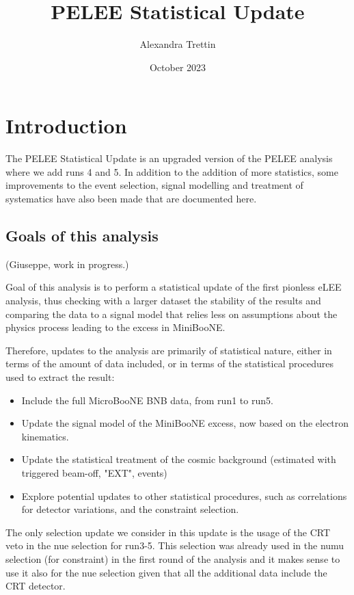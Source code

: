 \documentclass{article}
\title{PELEE Statistical Update}
\author{Alexandra Trettin}
\date{October 2023}
\begin{document}
\maketitle

\section{Introduction}

The PELEE Statistical Update is an upgraded version of the PELEE analysis where we add runs 4 and 5. In addition to the addition of more statistics, some improvements to the event selection, signal modelling and treatment of systematics have also been made that are documented here. 

\subsection{Goals of this analysis}
(Giuseppe, work in progress.)

Goal of this analysis is to perform a statistical update of the first pionless eLEE analysis, thus checking with a larger dataset the stability of the results and comparing the data to a signal model that relies less on assumptions about the physics process leading to the excess in MiniBooNE.

Therefore, updates to the analysis are primarily of statistical nature, either in terms of the amount of data included, or in terms of the statistical procedures used to extract the result:
\begin{itemize}
    \item Include the full MicroBooNE BNB data, from run1 to run5.
    \item Update the signal model of the MiniBooNE excess, now based on the electron kinematics.
    \item Update the statistical treatment of the cosmic background (estimated with triggered beam-off, "EXT", events)
    \item Explore potential updates to other statistical procedures, such as correlations for detector variations, and the constraint selection.
\end{itemize}
The only selection update we consider in this update is the usage of the CRT veto in the nue selection for run3-5. This selection was already used in the numu selection (for constraint) in the first round of the analysis and it makes sense to use it also for the nue selection given that all the additional data include the CRT detector.
\end{document}
